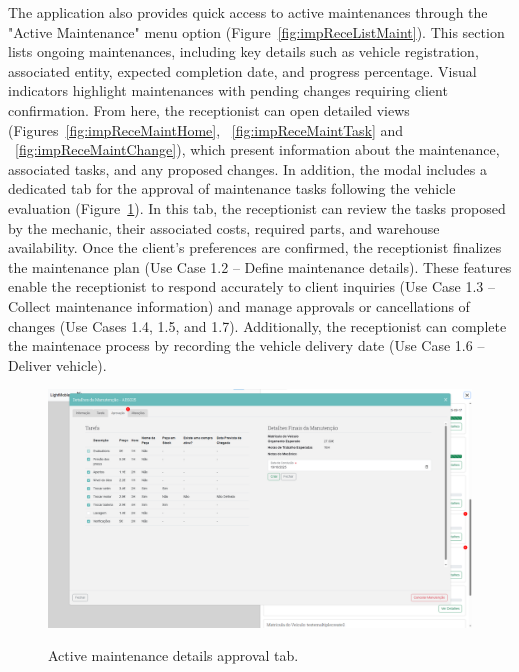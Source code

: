 The application also provides quick access to active maintenances through the "Active Maintenance" menu option (Figure~\ref{fig:impReceListMaint}). This section lists ongoing maintenances, including key details such as vehicle registration, associated entity, expected completion date, and progress percentage. Visual indicators highlight maintenances with pending changes requiring client confirmation. From here, the receptionist can open detailed views (Figures~\ref{fig:impReceMaintHome}, ~\ref{fig:impReceMaintTask} and ~\ref{fig:impReceMaintChange}), which present information about the maintenance, associated tasks, and any proposed changes. 
In addition, the modal includes a dedicated tab for the approval of maintenance tasks following the vehicle evaluation (Figure~\ref{fig:impReceMaintApproval}). In this tab, the receptionist can review the tasks proposed by the mechanic, their associated costs, required parts, and warehouse availability. Once the client's preferences are confirmed, the receptionist finalizes the maintenance plan (Use Case 1.2 – Define maintenance details).
These features enable the receptionist to respond accurately to client inquiries (Use Case 1.3 – Collect maintenance information) and manage approvals or cancellations of changes (Use Cases 1.4, 1.5, and 1.7). Additionally, the receptionist can complete the maintenace process by recording the vehicle delivery date (Use Case 1.6 – Deliver vehicle).



\begin{figure}[htbp]
  \caption{Active maintenance details approval tab.}
  \centering
  \includegraphics[width=\textwidth]{figs/Implementation/rececionist/maintenance_details_approval}
  \label{fig:impReceMaintApproval}
\end{figure}



